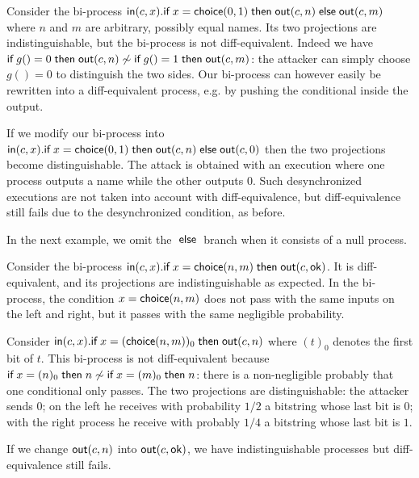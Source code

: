 \begin{example}
  Consider the bi-process
  $\mathsf{in}(c,x).\textsf{if}\; x=\mathsf{choice}(0,1) \;\textsf{then}\; \mathsf{out}(c,n) \;\textsf{else}\; \mathsf{out}(c,m)$
  where $n$ and $m$ are arbitrary, possibly equal names.
  Its two projections are indistinguishable, but the
  bi-process is not diff-equivalent.
  Indeed we have 
  $\textsf{if}\; g()=0 \;\textsf{then}\; \mathsf{out}(c,n) \not\sim
   \textsf{if}\; g()=1 \;\textsf{then}\; \mathsf{out}(c,m)$: the attacker can simply choose
  $g()=0$ to distinguish the two sides.
  Our bi-process can however easily be
  rewritten into a diff-equivalent process, e.g. by pushing the conditional
  inside the output.

  If we modify our bi-process into
  $\mathsf{in}(c,x).\textsf{if}\; x=\mathsf{choice}(0,1) \;\textsf{then}\; \mathsf{out}(c,n) \;\textsf{else}\; \mathsf{out}(c,0)$
  then the two projections become distinguishable.
  The attack is obtained with an execution
  where one process outputs a name while the other outputs $0$. Such
  desynchronized executions are not taken into account with diff-equivalence,
  but diff-equivalence still fails due to the desynchronized condition,
  as before.
\end{example}

\newcommand{\ok}{\mathsf{ok}}

In the next example, we omit the $\;\textsf{else}\;$ branch when it consists of a null 
process.

\begin{example}
  Consider the bi-process
  $\In(c,x).\myif x=\diff{n}{m} \mythen \Out(c,\ok)$.
  It is diff-equivalent, and its projections are
  indistinguishable as expected.
  In the bi-process, the condition $x=\mathsf{choice}(n,m)$ does not pass
  with the same inputs on the left and right, but it passes with
  the same negligible probability.
\end{example}

\begin{example} \label{ex:sync}
  Consider
  $\mathsf{in}(c,x).\textsf{if}\; x=(\mathsf{choice}(n,m))_0 \;\textsf{then}\; \mathsf{out}(c,n)$
  where $(t)_0$ denotes the first bit of $t$.
  This bi-process is not diff-equivalent because
  $\textsf{if}\; x=(n)_0 \;\textsf{then}\; n \not\sim \textsf{if}\; x=(m)_0 \;\textsf{then}\; n$:
  there is a non-negligible probably that one conditional only passes.
  The two projections are distinguishable: the attacker sends $0$;
  on the left he receives with probability $1/2$ a bitstring whose
  last bit is $0$;
  with the right process he receive with probably $1/4$
  a bitstring whose last bit is $1$.

  If we change $\mathsf{out}(c,n)$ into $\Out(c,\ok)$,
  we have indistinguishable processes but diff-equivalence still fails.
\end{example}

